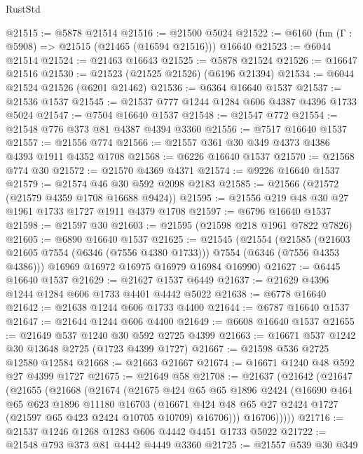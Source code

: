 \begin{lexlean}{RustStd}
\begin{coremodule}
@21515 := @5878 @21514
@21516 := @21500 @5024
@21522 := @6160 (fun (Γ : @5908) => @21515 (@21465 (@16594 @21516))) @16640
@21523 := @6044 @21514
@21524 := @21463 @16643
@21525 := @5878 @21524
@21526 := @16647 @21516
@21530 := @21523 (@21525 @21526) (@6196 @21394)
@21534 := @6044 @21524 @21526 (@6201 @21462)
@21536 := @6364 @16640 @1537
@21537 := @21536 @1537
@21545 := @21537 @777 @1244 @1284 @606 @4387 @4396 @1733 @5024
@21547 := @7504 @16640 @1537
@21548 := @21547 @772
@21554 := @21548 @776 @373 @81 @4387 @4394 @3360
@21556 := @7517 @16640 @1537
@21557 := @21556 @774
@21566 := @21557 @361 @30 @349 @4373 @4386 @4393 @1911 @4352 @1708
@21568 := @6226 @16640 @1537
@21570 := @21568 @774 @30
@21572 := @21570 @4369 @4371
@21574 := @9226 @16640 @1537
@21579 := @21574 @46 @30 @592 @2098 @2183
@21585 := @21566 (@21572 (@21579 @4359 @1708 @16688 @9424))
@21595 := @21556 @219 @48 @30 @27 @1961 @1733 @1727 @1911 @4379 @1708
@21597 := @6796 @16640 @1537
@21598 := @21597 @30
@21603 := @21595 (@21598 @218 @1961 @7822 @7826)
@21605 := @6890 @16640 @1537
@21625 := @21545
    (@21554
      (@21585 (@21603 @21605 @7554 (@6346 (@7556 @4380 @1733))) @7554 (@6346 (@7556 @4353 @4386)))
      @16969
      @16972
      @16975
      @16979
      @16984
      @16990)
@21627 := @6445 @16640 @1537
@21629 := @21627 @1537 @6449
@21637 := @21629 @4396 @1244 @1284 @606 @1733 @4401 @4442 @5022
@21638 := @6778 @16640
@21642 := @21638 @1244 @606 @1733 @4400
@21644 := @6787 @16640 @1537
@21647 := @21644 @1244 @606 @4400
@21649 := @6608 @16640 @1537
@21655 := @21649 @537 @1240 @30 @592 @2725 @4399
@21663 := @16671 @537 @1242 @30 @13648 @2725 (@1723 @4399 @1727)
@21667 := @21598 @536 @2725 @12580 @12584
@21668 := @21663 @21667
@21674 := @16671 @1240 @48 @592 @27 @4399 @1727
@21675 := @21649 @58
@21708 := @21637
    (@21642
      (@21647
        (@21655
          (@21668
            (@21674
              (@21675
                @424
                @65
                @65
                @1896
                @2424
                (@16690
                  @464
                  @65
                  @623
                  @1896
                  @11180
                  @16703
                  (@16671
                    @424
                    @48
                    @65
                    @27
                    @2424
                    @1727
                    (@21597 @65 @423 @2424 @10705 @10709)
                    @16706)))
              @16706)))))
@21716 := @21537 @1246 @1268 @1283 @606 @4442 @4451 @1733 @5022
@21722 := @21548 @793 @373 @81 @4442 @4449 @3360
@21725 := @21557 @539 @30 @349

\end{coremodule}
\end{lexlean}
